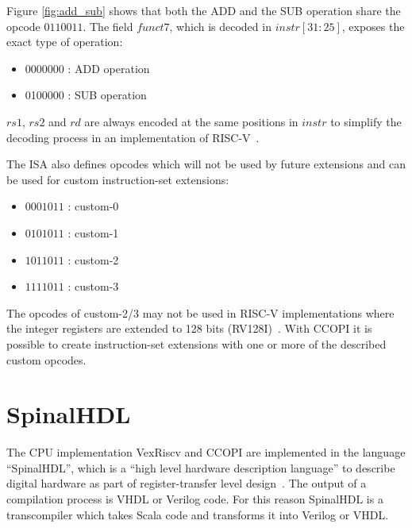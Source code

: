 \documentclass[twoside,twocolumn]{article}
\begin{document}
\noindent Figure \ref*{fig:add_sub} shows that both the ADD and the SUB
operation share the opcode $0110011$. The field $funct7$, which is
decoded in $instr[31:25]$, exposes the exact type of operation:
\begin{itemize}
    \item 0000000 : ADD operation
    \item 0100000 : SUB operation
\end{itemize}
$rs1$, $rs2$ and $rd$ are always encoded at the same positions
in $instr$ to simplify the decoding process in an implementation of
RISC-V~\cite[p. 11]{riscv}.

The ISA also defines opcodes which will not be used by future extensions
and can be used for custom instruction-set extensions:
    \begin{itemize}
        \item $0001011$ : custom-0
        \item $0101011$ : custom-1
        \item $1011011$ : custom-2
        \item $1111011$ : custom-3
    \end{itemize}
The opcodes of custom-2/3 may not be used in RISC-V implementations where the
integer registers are extended to 128 bits (RV128I)~\cite[p. 103]{riscv}. With CCOPI it is
possible to create instruction-set extensions with one or more of the described 
custom opcodes.
\section{SpinalHDL}
The CPU implementation VexRiscv and CCOPI are implemented in the
language ``SpinalHDL'', which is a ``high level hardware description
language'' to describe digital hardware as part of register-transfer
level design~\cite{spinal_doc1}. The output of a compilation process is VHDL or
Verilog code. For this reason SpinalHDL is a transcompiler which takes
Scala code and transforms it into Verilog or VHDL.  
\end{document}

